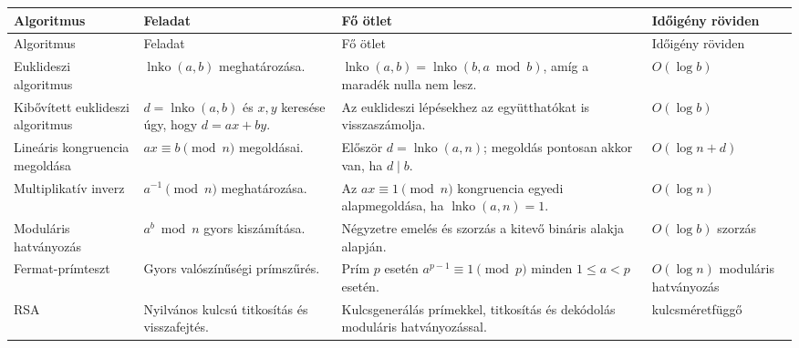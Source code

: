 \begingroup
\setlength{\tabcolsep}{4pt}
\begin{longtable}{L{0.21\textwidth}L{0.35\textwidth}L{0.23\textwidth}L{0.10\textwidth}}
\toprule
Algoritmus & Feladat & Fő ötlet & Időigény röviden \\
\midrule
\endfirsthead
\toprule
Algoritmus & Feladat & Fő ötlet & Időigény röviden \\
\midrule
\endhead
Euklideszi algoritmus & $\operatorname{lnko}(a,b)$ meghatározása. & $\operatorname{lnko}(a,b)=\operatorname{lnko}(b,a\bmod b)$, amíg a maradék nulla nem lesz. & $O(\log b)$ \\
Kibővített euklideszi algoritmus & $d=\operatorname{lnko}(a,b)$ és $x,y$ keresése úgy, hogy $d=ax+by$. & Az euklideszi lépésekhez az együtthatókat is visszaszámolja. & $O(\log b)$ \\
Lineáris kongruencia megoldása & $ax\equiv b\pmod n$ megoldásai. & Először $d=\operatorname{lnko}(a,n)$; megoldás pontosan akkor van, ha $d\mid b$. & $O(\log n+d)$ \\
Multiplikatív inverz & $a^{-1}\pmod n$ meghatározása. & Az $ax\equiv1\pmod n$ kongruencia egyedi alapmegoldása, ha $\operatorname{lnko}(a,n)=1$. & $O(\log n)$ \\
Moduláris hatványozás & $a^b\bmod n$ gyors kiszámítása. & Négyzetre emelés és szorzás a kitevő bináris alakja alapján. & $O(\log b)$ szorzás \\
Fermat-prímteszt & Gyors valószínűségi prímszűrés. & Prím $p$ esetén $a^{p-1}\equiv1\pmod p$ minden $1\leq a<p$ esetén. & $O(\log n)$ moduláris hatványozás \\
RSA & Nyilvános kulcsú titkosítás és visszafejtés. & Kulcsgenerálás prímekkel, titkosítás és dekódolás moduláris hatványozással. & kulcsméretfüggő \\
\bottomrule
\end{longtable}
\endgroup
